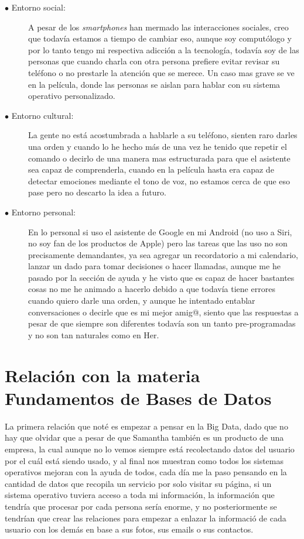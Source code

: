 \documentclass[paper=a4, fontsize=12pt]{scrartcl} %
\begin{document}
\begin{description}
	\item[$\bullet$ Entorno social:] A pesar de los \textit{smartphones} han mermado las interacciones sociales, creo que todavía estamos a tiempo de cambiar eso, aunque soy computólogo y por lo tanto tengo mi respectiva adicción a la tecnología, todavía soy de las personas que cuando charla con otra persona prefiere evitar revisar su teléfono o no prestarle la atención que se merece. Un caso mas grave se ve en la película, donde las personas se aislan para hablar con su sistema operativo personalizado.
	
	\item[$\bullet$ Entorno cultural:] La gente no está acostumbrada a hablarle a su teléfono, sienten raro darles una orden y cuando lo he hecho más de una vez he tenido que repetir el comando o decirlo de una manera mas estructurada para que el asistente sea capaz de comprenderla, cuando en la película hasta era capaz de detectar emociones mediante el tono de voz, no estamos cerca de que eso pase pero no descarto la idea a futuro.
	
	\item[$\bullet$ Entorno personal:] En lo personal si uso el asistente de Google en mi Android (no uso a Siri, no soy fan de los productos de Apple) pero las tareas que las uso no son precisamente demandantes, ya sea agregar un recordatorio a mi calendario, lanzar un dado para tomar decisiones o hacer llamadas, aunque me he pasado por la sección de ayuda y he visto que es capaz de hacer bastantes cosas no me he animado a hacerlo debido a que todavía tiene errores cuando quiero darle una orden, y aunque he intentado entablar conversaciones o decirle que es mi mejor amig@, siento que las respuestas a pesar de que siempre son diferentes todavía son un tanto pre-programadas y no son tan naturales como en Her.
\end{description}


\section{Relación con la materia Fundamentos de Bases de Datos}

La primera relación que noté es empezar a pensar en la Big Data, dado que no hay que olvidar que a pesar de que Samantha también es un producto de una empresa, la cual aunque no lo vemos siempre está recolectando datos del usuario por el cuál está siendo usado, y al final nos muestran como todos los sistemas operativos mejoran con la ayuda de todos, cada día me la paso pensando en la cantidad de datos que recopila un servicio por solo visitar su página, si un sistema operativo tuviera acceso a toda mi información, la información que tendría que procesar por cada persona sería enorme, y no posteriormente se tendrían que crear las relaciones para empezar a enlazar la informació de cada usuario con los demás en base a sus fotos, sus emails o sus contactos.
\end{document}
